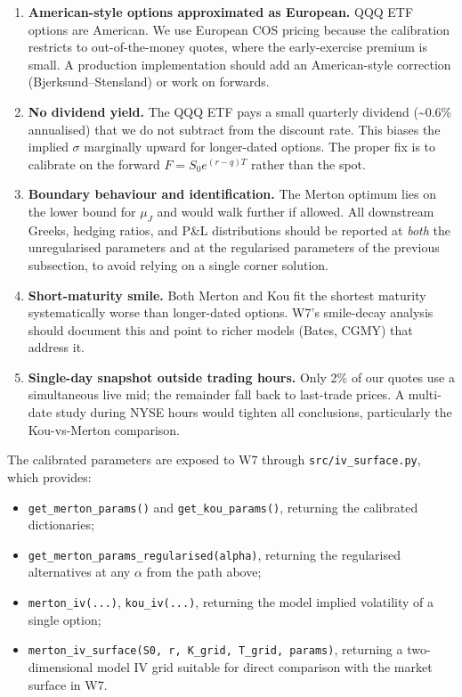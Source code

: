 \documentclass[11pt,a4paper]{article}
\begin{document}
\begin{enumerate}[leftmargin=*]
   \item \textbf{American-style options approximated as European.}
   QQQ ETF options are American. We use European COS pricing because
   the calibration restricts to out-of-the-money quotes, where the
   early-exercise premium is small. A production implementation
   should add an American-style correction (Bjerksund--Stensland) or
   work on forwards.

   \item \textbf{No dividend yield.} The QQQ ETF pays a small
   quarterly dividend (\textasciitilde$0.6\%$ annualised) that we do
   not subtract from the discount rate. This biases the implied
   $\sigma$ marginally upward for longer-dated options. The proper
   fix is to calibrate on the forward $F = S_0 e^{(r-q)T}$ rather
   than the spot.

   \item \textbf{Boundary behaviour and identification.} The Merton
   optimum lies on the lower bound for $\mu_J$ and would walk further
   if allowed. All downstream Greeks, hedging ratios, and P\&L
   distributions should be reported at \emph{both} the unregularised
   parameters and at the regularised parameters of the previous
   subsection, to avoid relying on a single corner solution.

   \item \textbf{Short-maturity smile.} Both Merton and Kou fit the
   shortest maturity systematically worse than longer-dated options.
   W7's smile-decay analysis should document this and point to richer
   models (Bates, CGMY) that address it.

   \item \textbf{Single-day snapshot outside trading hours.} Only 2\%
   of our quotes use a simultaneous live mid; the remainder fall back
   to last-trade prices. A multi-date study during NYSE hours would
   tighten all conclusions, particularly the Kou-vs-Merton comparison.
\end{enumerate}

The calibrated parameters are exposed to W7 through
\texttt{src/iv\_surface.py}, which provides:
\begin{itemize}[leftmargin=*]
   \item \texttt{get\_merton\_params()} and \texttt{get\_kou\_params()},
         returning the calibrated dictionaries;
   \item \texttt{get\_merton\_params\_regularised(alpha)}, returning the
         regularised alternatives at any $\alpha$ from the path above;
   \item \texttt{merton\_iv(...)}, \texttt{kou\_iv(...)}, returning the
         model implied volatility of a single option;
   \item \texttt{merton\_iv\_surface(S0, r, K\_grid, T\_grid, params)},
         returning a two-dimensional model IV grid suitable for direct
         comparison with the market surface in W7.
\end{itemize}
\end{document}
